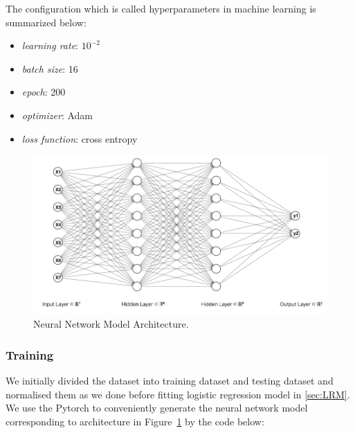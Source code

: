 \documentclass[final-report]{report-template}
\begin{document}
The configuration which is called hyperparameters in machine learning is summarized below:

\begin{itemize}
    \item \textit{learning rate}: $10^{-2}$
    \item \textit{batch size}: 16
    \item \textit{epoch}: 200
    \item \textit{optimizer}: Adam
    \item \textit{loss function}: cross entropy
\end{itemize}

\begin{figure}
    \begin{center}
        \includegraphics[width=1\textwidth]{neural_network_model.png}
    \end{center}
    \caption{\label{fig:neural_network_model} Neural Network Model Architecture.}
\end{figure}

\subsubsection{Training}
We initially divided the dataset into training dataset and testing dataset and normalised them as we done before fitting logistic regression model in \ref{sec:LRM}.
We use the Pytorch to conveniently generate the neural network model corresponding to architecture in Figure~\ref{fig:neural_network_model} by the code below:
\end{document}
